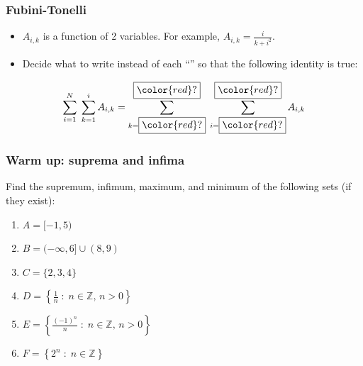 \begin{frame}[t]
	\fontsize{13}{13}\selectfont
	\frametitle{Fubini-Tonelli}

	\begin{itemize}
		\item $A_{i,k}$ is a function of 2 variables. \; For example, $\displaystyle
			A_{i,k}= \frac{i}{k+i^{2}}$.

		\item Decide what to write instead of each ``''
			so that the following identity is true:
	\end{itemize}

	{\fontsize{20}{20}\selectfont \begin{equation*}\sum_{i=1}^{N}\; \sum_{k=1}^{i}A_{i, k}= \sum_{k = \boxed{{\color{red} ?}}}^{\boxed{{\color{red} ?}}}\; \sum_{i=\boxed{{\color{red} ?}}}^{\boxed{{\color{red} ?}}}A_{i,k}\end{equation*} }
\end{frame}

\begin{frame}[t]
	\fontsize{13}{13}\selectfont
	\frametitle{Warm up: suprema and infima}

	Find the supremum, infimum, maximum, and minimum of the following sets (if they
	exist):

	\begin{enumerate}
		\vfill

		\item $\displaystyle A = [-1,5)$
			\vfill

		\item $\displaystyle B = (-\infty,6] \cup (8, 9)$
			\vfill

		\item $\displaystyle C = \{ 2, 3, 4\}$
			\vfill

		\item $\displaystyle D = \left\{ \frac{1}{n}\; : \; n \in \mathbb{Z}, \, n >0
			\right\}$
			\vfill

		\item $\displaystyle E = \left\{ \frac{(-1)^{n}}{n}\; : \; n \in \mathbb{Z},
			\, n >0 \right\}$
			\vfill

		\item $\displaystyle F = \left\{ 2^{n}\; : \; n \in \mathbb{Z}\right\}$
			\vfill
	\end{enumerate}
\end{frame}

